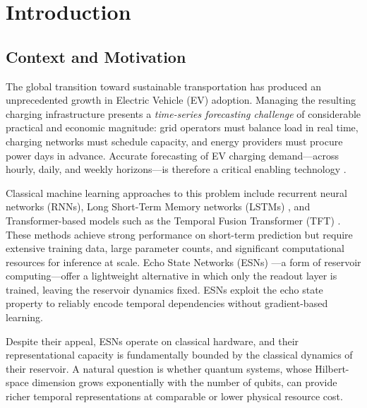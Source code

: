 
\chapter{Introduction}
\label{chap:intro}


\section{Context and Motivation}
\label{sec:intro:context}

The global transition toward sustainable transportation has produced an
unprecedented growth in Electric Vehicle (EV) adoption. Managing the
resulting charging infrastructure presents a \emph{time-series forecasting
challenge} of considerable practical and economic magnitude: grid operators
must balance load in real time, charging networks must schedule capacity,
and energy providers must procure power days in advance. Accurate
forecasting of EV charging demand—across hourly, daily, and weekly
horizons—is therefore a critical enabling technology
\citep{acaroglu2022acn, chen2020ev}.

Classical machine learning approaches to this problem include recurrent
neural networks (RNNs), Long Short-Term Memory networks (LSTMs)
\citep{hochreiter1997lstm}, and Transformer-based models such as the
Temporal Fusion Transformer (TFT) \citep{lim2019tft}. These methods achieve
strong performance on short-term prediction but require extensive
training data, large parameter counts, and significant computational
resources for inference at scale. Echo State Networks (ESNs)
\citep{jaeger2004harnessing}—a form of reservoir computing—offer a
lightweight alternative in which only the readout layer is trained,
leaving the reservoir dynamics fixed. ESNs exploit the echo state
property to reliably encode temporal dependencies without gradient-based
learning.

Despite their appeal, ESNs operate on classical hardware, and their
representational capacity is fundamentally bounded by the classical
dynamics of their reservoir. A natural question is whether quantum
systems, whose Hilbert-space dimension grows exponentially with the
number of qubits, can provide richer temporal representations at
comparable or lower physical resource cost.

